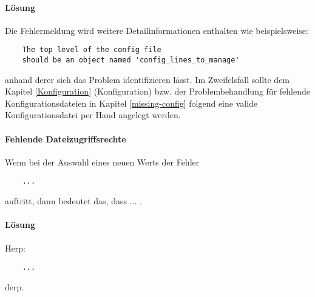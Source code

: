 \paragraph{Lösung}
Die Fehlermeldung wird weitere Detailinformationen enthalten wie beispielsweise:

\begin{verbatim}
    The top level of the config file
    should be an object named 'config_lines_to_manage'
\end{verbatim}

anhand derer sich das Problem identifizieren lässt. Im Zweifelsfall sollte dem
Kapitel \ref{Konfiguration} (Konfiguration) bzw. der Problembehandlung für
fehlende Konfigurationsdateien in Kapitel \ref{missing-config} folgend eine valide Konfigurationsdatei
per Hand angelegt werden.

\paragraph{Fehlende Dateizugriffsrechte} Wenn bei der Auswahl eines neuen Werts
der Fehler

\begin{verbatim}
    ...
\end{verbatim}

auftritt, dann bedeutet das, dass ... .

\paragraph{Lösung}
Herp:

\begin{verbatim}
    ...
\end{verbatim}

derp.
